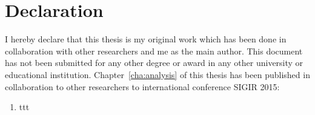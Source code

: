 \chapter*{Declaration}
\vspace{-1em}
I hereby declare that this thesis is my original work which has been done in 
collaboration with other researchers and me as the main author. This document has
not been submitted for any other degree or award in any other university or educational 
institution. Chapter~\ref{cha:analysis} of this thesis has been published in collaboration to other
researchers to international conference SIGIR 2015:
\begin{enumerate}
\item ttt
\end{enumerate}

